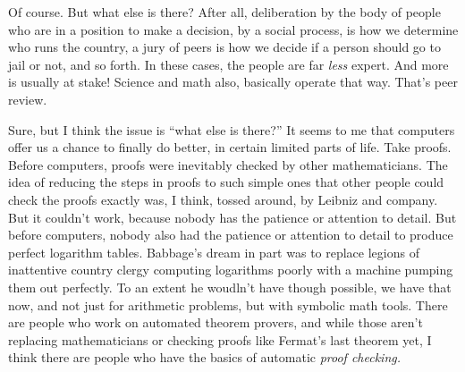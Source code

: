 \documentclass[sigplan]{acmart}
\begin{document}
 Of course.  But what else is there?  After
all, deliberation by the body of people who are in a position to make
a decision, by a social process, is how we determine who runs the country, a jury
of peers is how we decide if a person should go to jail or not, and so
forth.  In these cases, the people are far \emph{less} expert.  And
more is usually at stake!  Science and math also, basically operate
that way.  That's peer review.


\vspace{0.1in}
\vspace{0.1in}


  Sure, but I think the issue is ``what
else is there?''  It seems to me that computers offer us a chance to
finally do better, in certain limited parts of life.  Take proofs.
Before computers, proofs were inevitably checked by other
mathematicians.  The idea of reducing the steps in proofs to such
simple ones that other people could check the proofs exactly was, I
think, tossed around, by Leibniz and company.  But it couldn't work,
because nobody has the patience or attention to detail.  But before
computers, nobody also had the patience or attention to detail to
produce perfect logarithm tables.  Babbage's dream in part was to
replace legions of inattentive country clergy computing logarithms
poorly with a machine pumping them out perfectly.  To an extent he
woudln't have though possible, we have that now, and not just for
arithmetic problems, but with symbolic math tools.  There are people
who work on automated theorem provers, and while those aren't
replacing mathematicians or checking proofs like Fermat's last theorem
yet, I think there are people who have the basics of automatic
\emph{proof checking.}
\end{document}
